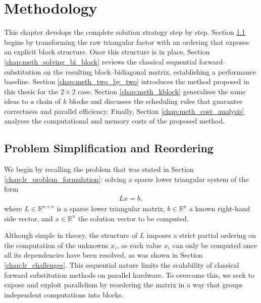 \chapter{Methodology}
\label{chapter:methodology}
This chapter develops the complete solution strategy step by step.  
Section \ref{chap:meth_problem_simp_and_reorder} begins by transforming the raw triangular factor with an ordering that exposes an explicit block structure.  Once this structure is in place, Section \ref{chap:meth_solving_bi_block} reviews the classical sequential forward–substitution on the resulting block–bidiagonal matrix, establishing a performance baseline.  
Section \ref{chap:meth_two_by_two} introduces the method proposed in this thesis for the $2 \times 2$ case.
Section \ref{chap:meth_kblock} generalises the same ideas to a chain of $k$ blocks and discusses the scheduling rules that guarantee correctness and parallel efficiency.  
Finally, Section \ref{chap:meth_cost_analysis} analyses the computational and memory costs of the proposed method.

\section{Problem Simplification and Reordering}
\label{chap:meth_problem_simp_and_reorder}
We begin by recalling the problem that was stated in Section \ref{chap:lr_problem_formulation}: solving a sparse lower triangular system of the form
\begin{align}
    Lx=b,
\end{align}
where $L \in \mathbb{R}^{n \times n}$ is a sparse lower triangular matrix, $b \in \mathbb{R}^{n}$ a known right-hand side vector, and $x \in \mathbb{R}^{n}$ the solution vector to be computed. 

Although simple in theory, the structure of $L$ imposes a strict partial ordering on the computation of the unknowns $x_i$, as each value $x_i$ can only be computed once all its dependencies have been resolved, as was shown in Section \ref{chap:lr_challenges}. This sequential nature limits the scalability of classical forward substitution methods on parallel hardware. To overcome this, we seek to expose and exploit parallelism by reordering the matrix in a way that groups independent computations into blocks.


